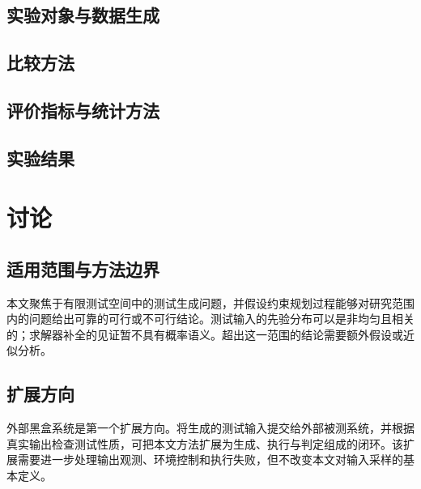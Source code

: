 \documentclass[UTF8, fontset=none, a4paper, 12pt]{ctexart}
\begin{document}

\subsection{实验对象与数据生成}


\subsection{比较方法}


\subsection{评价指标与统计方法}


\subsection{实验结果}


\section{讨论}

\subsection{适用范围与方法边界}

本文聚焦于有限测试空间中的测试生成问题，并假设约束规划过程能够对研究范围内的问题给出可靠的可行或不可行结论。测试输入的先验分布可以是非均匀且相关的；求解器补全的见证暂不具有概率语义。超出这一范围的结论需要额外假设或近似分析。

\subsection{扩展方向}

外部黑盒系统是第一个扩展方向。将生成的测试输入提交给外部被测系统，并根据真实输出检查测试性质，可把本文方法扩展为生成、执行与判定组成的闭环。该扩展需要进一步处理输出观测、环境控制和执行失败，但不改变本文对输入采样的基本定义。
\end{document}
